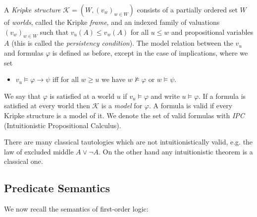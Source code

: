 \documentclass[runningheads]{llncs}
\begin{document}
\begin{definition}
	A \emph{Kripke structure} $\mathcal K = (W, (v_w)_{w\in W})$ consists of a partially ordered set $W$ of \emph{worlds}, called the Kripke \emph{frame}, and an indexed family of valuations $(v_w)_{w\in W}$ such that $v_u(A)\leq v_w(A)$ for all $u\leq w$ and propositional variables $A$ (this is called the \emph{persistency condition}).
	The model relation between the $v_u$ and formulas $\varphi$ is defined as before, except in the case of implications, where we set
	\begin{itemize}
		\item $v_u\models\varphi\to \psi$ iff for all $w\geq u$ we have $w\not\models\varphi$ or $w\models\psi$.
	\end{itemize}
	We say that $\varphi$ is satisfied at a world $u$ if $v_u\models\varphi$ and write $u\models\varphi$. If a formula is satisfied at every world then $\mathcal K$ is a \emph{model} for $\varphi$. A formula is valid if every Kripke structure is a model of it. We denote the set of valid formulas with \emph{IPC} (Intuitionistic Propositional Calculus).
\end{definition}
There are many classical tautologies which are not intuitionistically valid, e.g. the law of excluded middle $A\vee\neg A$. On the other hand any intuitionistic theorem is a classical one.

\subsection{Predicate Semantics}

We now recall the semantics of first-order logic:
\end{document}
